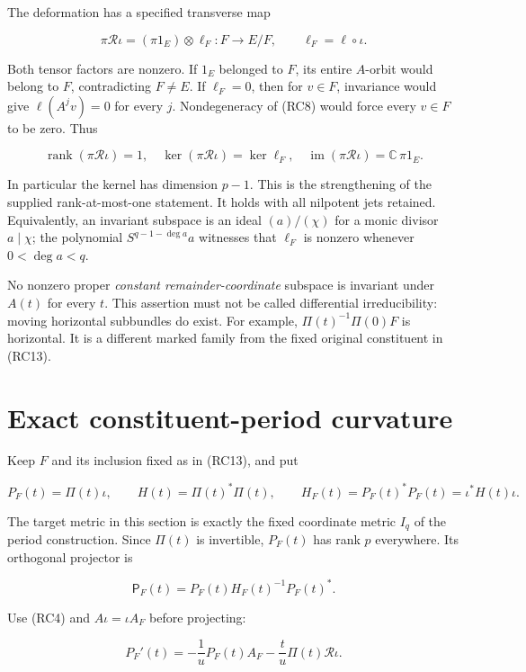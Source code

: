\documentclass[
  11pt,
]{article}
\begin{document}
The deformation has a specified transverse map

\[
\boxed{\pi\mathcal R\iota
=(\pi1_E)\otimes\ell_F:F\longrightarrow E/F,
\qquad \ell_F=\ell\circ\iota.}
\tag{RC14}
\]

Both tensor factors are nonzero. If \(1_E\) belonged to \(F\), its
entire \(A\)-orbit would belong to \(F\), contradicting \(F\ne E\). If
\(\ell_F=0\), then for \(v\in F\), invariance would give
\(\ell(A^jv)=0\) for every \(j\). Nondegeneracy of (RC8) would force
every \(v\in F\) to be zero. Thus

\[
\boxed{\operatorname{rank}(\pi\mathcal R\iota)=1,
\quad \ker(\pi\mathcal R\iota)=\ker\ell_F,
\quad \operatorname{im}(\pi\mathcal R\iota)=\mathbb C\,\pi1_E.}
\tag{RC15}
\]

In particular the kernel has dimension \(p-1\). This is the
strengthening of the supplied rank-at-most-one statement. It holds with
all nilpotent jets retained. Equivalently, an invariant subspace is an
ideal \((a)/(\chi)\) for a monic divisor \(a\mid\chi\); the polynomial
\(S^{q-1-\deg a}a\) witnesses that \(\ell_F\) is nonzero whenever
\(0<\deg a<q\).

No nonzero proper \emph{constant remainder-coordinate} subspace is
invariant under \(A(t)\) for every \(t\). This assertion must not be
called differential irreducibility: moving horizontal subbundles do
exist. For example, \(\Pi(t)^{-1}\Pi(0)F\) is horizontal. It is a
different marked family from the fixed original constituent in (RC13).

\section{Exact constituent-period
curvature}\label{exact-constituent-period-curvature}

Keep \(F\) and its inclusion fixed as in (RC13), and put

\[
P_F(t)=\Pi(t)\iota,\qquad
H(t)=\Pi(t)^*\Pi(t),\qquad
H_F(t)=P_F(t)^*P_F(t)=\iota^*H(t)\iota.
\tag{RC16}
\]

The target metric in this section is exactly the fixed coordinate metric
\(I_q\) of the period construction. Since \(\Pi(t)\) is invertible,
\(P_F(t)\) has rank \(p\) everywhere. Its orthogonal projector is

\[
\mathsf P_F(t)=P_F(t)H_F(t)^{-1}P_F(t)^*.
\tag{RC17}
\]

Use (RC4) and \(A\iota=\iota A_F\) before projecting:

\[
P_F'(t)=-\frac1uP_F(t)A_F
-\frac t u\Pi(t)\mathcal R\iota.
\tag{RC18}
\]
\end{document}
